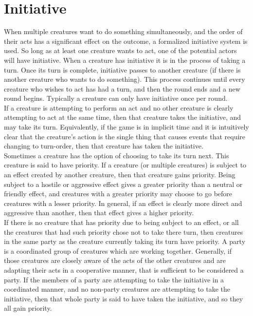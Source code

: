 \documentclass[letterpaper,titlepage,openany,twocolumn]{book}
\begin{document}
\section{Initiative}
When multiple creatures want to do something simultaneously, and the order of their acts has a significant effect on the outcome, a formalized initiative system is used. So long as at least one creature wants to act, one of the potential actors will have initiative. When a creature has initiative it is in the process of taking a turn. Once its turn is complete, initiative passes to another creature (if there is another creature who wants to do something). This process continues until every creature who wishes to act has had a turn, and then the round ends and a new round begins. Typically a creature can only have initiative once per round.\\

If a creature is attempting to perform an act and no other creature is clearly attempting to act at the same time, then that creature takes the initiative, and may take its turn. Equivalently, if the game is in implicit time and it is intuitively clear that the creature’s action is the single thing that causes events that require changing to turn-order, then that creature has taken the initiative.\\

Sometimes a creature has the option of choosing to take its turn next. This creature is said to have priority. 	If a creature (or multiple creatures) is subject to an effect created by another creature, then that creature gains priority. Being subject to a hostile or aggressive effect gives a greater priority than a neutral or friendly effect, and creatures with a greater priority may choose to go before creatures with a lesser priority. In general, if an effect is clearly more direct and aggressive than another, then that effect gives a higher priority.\\

If there is no creature that has priority due to being subject to an effect, or all the creatures that had such priority chose not to take there turn, then creatures in the same party as the creature currently taking its turn have priority. A party is a coordinated group of creatures which are working together. Generally, if those creatures are closely aware of the acts of the other creatures and are adapting their acts in a cooperative manner, that is sufficient to be considered a party. If the members of a party are attempting to take the initiative in a coordinated manner, and no non-party creatures are attempting to take the initiative, then that whole party is said to have taken the initiative, and so they all gain priority.\\
\end{document}
